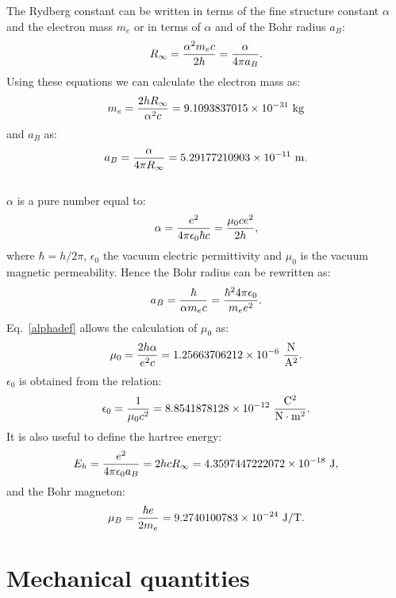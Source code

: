 \documentclass[12pt,a4paper,twoside]{report}
\def\me{9.1093837015\times 10^{-31}}
\def\abohr{5.29177210903\times 10^{-11}}
\def\muzero{1.25663706212\times 10^{-6}}
\def\epsilonzero{8.8541878128\times 10^{-12}}
\def\bohrmag{9.2740100783\times 10^{-24}}
\def\baru{4.3597447222072\times 10^{-18}}
\begin{document}
The Rydberg constant can be written in terms of the fine structure
constant $\alpha$ and the electron mass $m_e$ or in terms of $\alpha$ and
of the Bohr radius $a_B$:
\begin{equation}
R_\infty={\alpha^2 m_e c \over 2 h}={\alpha \over 4 \pi a_B}.
\end{equation}
Using these equations we can calculate the electron mass as:
\begin{equation}
m_e={2 h R_\infty\over \alpha^2 c}=
\me\ {\rm kg}
\end{equation} 
and $a_B$ as:
\begin{equation}
a_B={\alpha\over 4\pi R_\infty}=
\abohr\ {\rm m}.
\end{equation}
\\
$\alpha$ is a pure number equal to:
\begin{equation}
\alpha={e^2 \over 4 \pi \epsilon_0 \hbar c}= {\mu_0 c e^2 \over 2 h}, 
\label{alphadef}
\end{equation}
where $\hbar=h/2\pi$, $\epsilon_0$ the vacuum electric
permittivity and $\mu_0$ is the vacuum magnetic permeability. Hence
the Bohr radius can be rewritten as:
\begin{equation}
a_B={\hbar \over \alpha m_e c}=
{\hbar^2 4 \pi \epsilon_0 \over m_e e^2}.
\end{equation}
Eq.~\ref{alphadef} allows the calculation of $\mu_0$ as:
\begin{equation}
\mu_0={2 h \alpha \over e^2 c}=\muzero\ {{\rm N}\over {\rm A}^2}.
\label{mu0}
\end{equation}
$\epsilon_0$ is obtained from the relation:
\begin{equation}
\epsilon_0={1 \over \mu_0 c^2}=\epsilonzero\ 
{{\rm C}^2\over {\rm N}\cdot {\rm m}^2}.
\label{epsilon0}
\end{equation}
It is also useful to define the hartree energy:
\begin{equation}
E_h= {e^2\over 4\pi\epsilon_0 a_B}=2 h c R_\infty = \baru\ {\rm J},
\label{eh}
\end{equation}
and the Bohr magneton:
\begin{equation}
\mu_B = {\hbar e \over 2 m_e} = \bohrmag\ {\rm J}/{\rm T}.
\label{bohrm}
\end{equation}

\newpage

{\color{dark-blue}\chapter{Mechanical quantities}}
\end{document}
